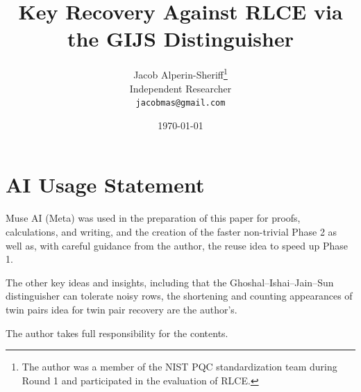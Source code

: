 \documentclass[11pt]{article}
\title{Key Recovery Against RLCE via the GIJS Distinguisher}
\author{Jacob Alperin-Sheriff\thanks{The author was a member of the NIST PQC
    standardization team during Round 1 and participated in the evaluation of
    RLCE.}\\{\small Independent Researcher}\\{\small
\texttt{jacobmas@gmail.com}}}
\date{\today}
\theoremstyle{definition}
\theoremstyle{remark}
\begin{document}
\maketitle















% 



% 









% 




\section*{AI Usage Statement}
Muse AI (Meta) was used in the preparation of this paper for proofs,
calculations, and writing, and the creation of the faster non-trivial Phase 2 as well as, with careful 
guidance from the author, the reuse idea to speed up Phase 1. 

The other key ideas and insights, including that
the Ghoshal--Ishai--Jain--Sun distinguisher can tolerate  noisy rows, the shortening and 
counting appearances of twin pairs idea for twin pair recovery are the author's.

The author takes full responsibility for the
contents.
\end{document}
